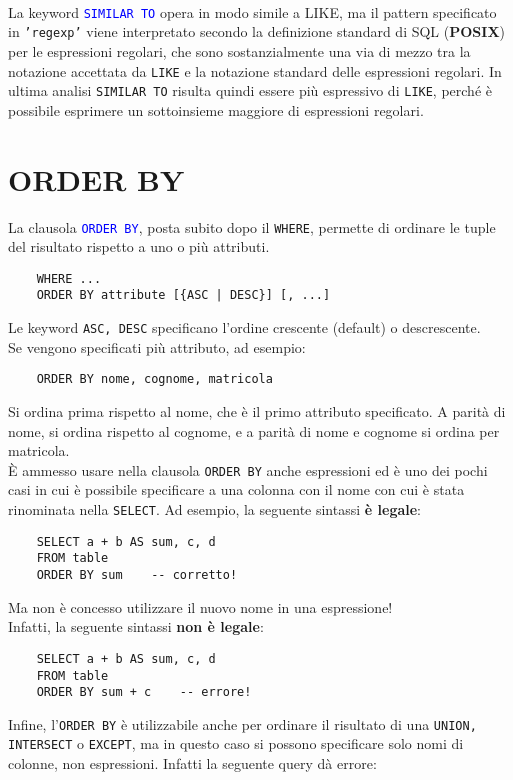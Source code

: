 \documentclass[12pt,a4paper]{book}
\begin{document}
	\paragraph{}La keyword \textcolor{blue}{\texttt{SIMILAR TO}} opera in modo simile a LIKE, ma il pattern specificato in \texttt{'regexp'} viene interpretato secondo la definizione standard di SQL (\textbf{POSIX}) per le espressioni regolari, che sono sostanzialmente una via di mezzo tra la notazione accettata da \texttt{LIKE} e la notazione standard delle espressioni regolari. In ultima analisi \texttt{SIMILAR TO} risulta quindi essere più espressivo di \texttt{LIKE}, perché è possibile esprimere un sottoinsieme maggiore di espressioni regolari.
	\section{ORDER BY}
	La clausola \textcolor{blue}{\texttt{ORDER BY}}, posta subito dopo il \texttt{WHERE}, permette di ordinare le tuple del risultato rispetto a uno o più attributi.
	\begin{lstlisting}
	WHERE ...
	ORDER BY attribute [{ASC | DESC}] [, ...]
	\end{lstlisting}
	Le keyword \texttt{ASC, DESC} specificano l'ordine crescente (default) o descrescente.\\
	Se vengono specificati più attributo, ad esempio:
	\begin{lstlisting}
	ORDER BY nome, cognome, matricola
	\end{lstlisting}
	Si ordina prima rispetto al nome, che è il primo attributo specificato. A parità di nome, si ordina rispetto al cognome, e a parità di nome e cognome si ordina per matricola.\\
	È ammesso usare nella clausola \texttt{ORDER BY} anche espressioni ed è uno dei pochi casi in cui è possibile specificare a una colonna con il nome con cui è stata rinominata nella \texttt{SELECT}. Ad esempio, la seguente sintassi \textbf{è legale}:
	\begin{lstlisting}
	SELECT a + b AS sum, c, d 
	FROM table
	ORDER BY sum	-- corretto!
	\end{lstlisting}
	Ma non è concesso utilizzare il nuovo nome in una espressione!\\Infatti, la seguente sintassi \textbf{non è legale}:
	\begin{lstlisting}
	SELECT a + b AS sum, c, d 
	FROM table
	ORDER BY sum + c	-- errore!
	\end{lstlisting} 
	Infine, l'\texttt{ORDER BY} è utilizzabile anche per ordinare il risultato di una \texttt{UNION, INTERSECT} o \texttt{EXCEPT}, ma in questo caso si possono specificare solo nomi di colonne, non espressioni. Infatti la seguente query dà errore:
\end{document}
